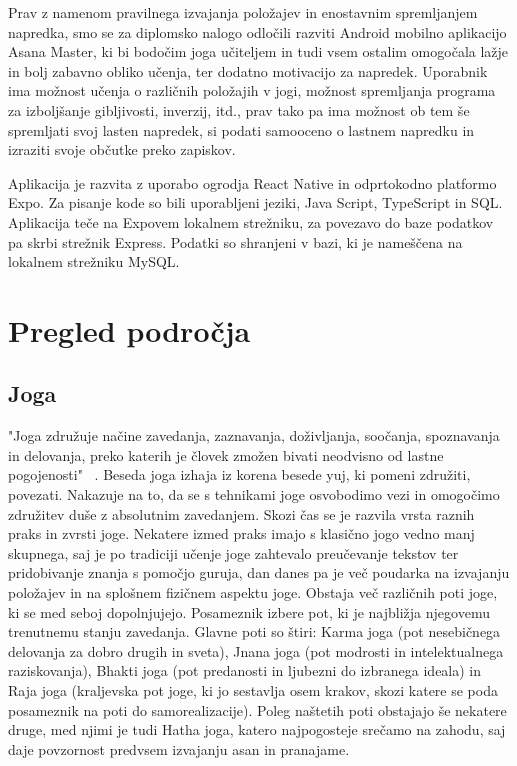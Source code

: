 \documentclass[a4paper, 12pt]{book}
\begin{document}
Prav z namenom pravilnega izvajanja položajev in enostavnim spremljanjem napredka, smo se za diplomsko nalogo odločili razviti Android mobilno aplikacijo Asana Master, ki bi bodočim joga učiteljem in tudi vsem ostalim omogočala lažje in bolj zabavno obliko učenja, ter dodatno motivacijo za napredek. Uporabnik ima  možnost učenja o različnih položajih v jogi, možnost spremljanja programa za izboljšanje gibljivosti, inverzij, itd., prav tako pa ima možnost ob tem še spremljati svoj lasten napredek, si podati samooceno o lastnem napredku in izraziti svoje občutke preko zapiskov.

Aplikacija je razvita z uporabo ogrodja React Native in odprtokodno platformo Expo. Za pisanje kode so bili uporabljeni jeziki, Java Script, TypeScript in SQL. Aplikacija teče na Expovem lokalnem strežniku, za povezavo do baze podatkov pa skrbi strežnik Express. Podatki so shranjeni v bazi, ki je nameščena na lokalnem strežniku MySQL.


\chapter{Pregled področja}
\label{ch0}

\section{Joga}
"Joga združuje načine zavedanja, zaznavanja, doživljanja, soočanja, spoznavanja in delovanja, preko katerih je človek zmožen bivati neodvisno od lastne pogojenosti" ~\cite{oJogi}.
Beseda joga izhaja iz korena besede yuj, ki pomeni združiti, povezati. Nakazuje na to, da se s tehnikami joge osvobodimo vezi in omogočimo združitev duše z absolutnim zavedanjem. Skozi čas se je razvila vrsta raznih praks in zvrsti joge. Nekatere izmed praks imajo s klasično jogo vedno manj skupnega, saj je po tradiciji učenje joge zahtevalo preučevanje tekstov ter pridobivanje znanja s pomočjo guruja, dan danes pa je več poudarka na izvajanju položajev in na splošnem fizičnem aspektu joge. Obstaja več različnih poti joge, ki se med seboj dopolnjujejo. Posameznik izbere pot, ki je najbližja njegovemu trenutnemu stanju zavedanja. Glavne poti so štiri: Karma joga (pot nesebičnega delovanja za dobro drugih in sveta), Jnana joga (pot modrosti in intelektualnega raziskovanja), Bhakti joga (pot predanosti in ljubezni do izbranega ideala) in Raja joga (kraljevska pot joge, ki jo sestavlja osem krakov, skozi katere se poda posameznik na poti do samorealizacije). Poleg naštetih poti obstajajo še nekatere druge, med njimi je tudi Hatha joga, katero najpogosteje srečamo na zahodu, saj daje povzornost predvsem izvajanju asan in pranajame.\\ 
\end{document}
